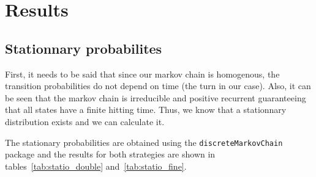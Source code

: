 \section{Results} %
\label{sec:results}

\subsection{Stationnary probabilites} %
\label{sub:stationnary_probabilites}

First, it needs to be said that since our markov chain is homogenous, 
the transition probabilities do not depend on time (the turn in our case).
Also, it can be seen that the markov chain is irreducible and positive recurrent guaranteeing 
that all states have a finite hitting time. 
Thus, we know that a stationnary distribution exists and we can calculate it.

The stationary probabilities are obtained using
the \lstinline|discreteMarkovChain| package and
the results for both strategies are shown in
tables~\ref{tab:statio_double} and~\ref{tab:statio_fine}.

